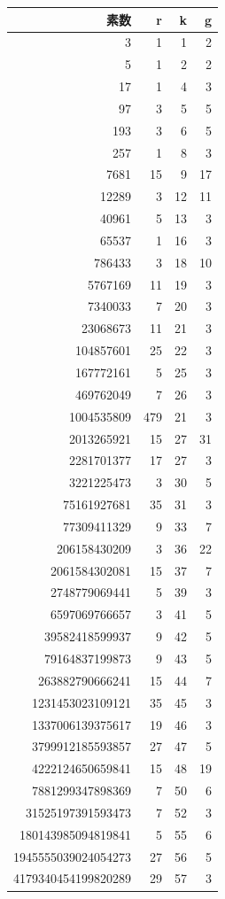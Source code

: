 \begin{table}[H]
\centering
\small
{\ttfamily
\begin{tabular}{rrrr}
\toprule
素数 & r & k & g \\
\midrule
3 & 1 & 1 & 2 \\
5 & 1 & 2 & 2 \\
17 & 1 & 4 & 3 \\
97 & 3 & 5 & 5 \\
193 & 3 & 6 & 5 \\
257 & 1 & 8 & 3 \\
7681 & 15 & 9 & 17 \\
12289 & 3 & 12 & 11 \\
40961 & 5 & 13 & 3 \\
65537 & 1 & 16 & 3 \\
786433 & 3 & 18 & 10 \\
5767169 & 11 & 19 & 3 \\
7340033 & 7 & 20 & 3 \\
23068673 & 11 & 21 & 3 \\
104857601 & 25 & 22 & 3 \\
167772161 & 5 & 25 & 3 \\
469762049 & 7 & 26 & 3 \\
1004535809 & 479 & 21 & 3 \\
2013265921 & 15 & 27 & 31 \\
2281701377 & 17 & 27 & 3 \\
3221225473 & 3 & 30 & 5 \\
75161927681 & 35 & 31 & 3 \\
77309411329 & 9 & 33 & 7 \\
206158430209 & 3 & 36 & 22 \\
2061584302081 & 15 & 37 & 7 \\
2748779069441 & 5 & 39 & 3 \\
6597069766657 & 3 & 41 & 5 \\
39582418599937 & 9 & 42 & 5 \\
79164837199873 & 9 & 43 & 5 \\
263882790666241 & 15 & 44 & 7 \\
1231453023109121 & 35 & 45 & 3 \\
1337006139375617 & 19 & 46 & 3 \\
3799912185593857 & 27 & 47 & 5 \\
4222124650659841 & 15 & 48 & 19 \\
7881299347898369 & 7 & 50 & 6 \\
31525197391593473 & 7 & 52 & 3 \\
180143985094819841 & 5 & 55 & 6 \\
1945555039024054273 & 27 & 56 & 5 \\
4179340454199820289 & 29 & 57 & 3 \\
\bottomrule
\end{tabular}
}
\end{table}
